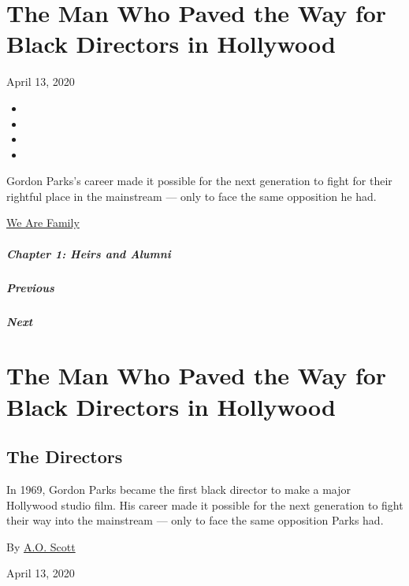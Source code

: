 \hypertarget{the-man-who-paved-the-way-for-black-directors-in-hollywood}{%
\section{The Man Who Paved the Way for Black Directors in
Hollywood}\label{the-man-who-paved-the-way-for-black-directors-in-hollywood}}

April 13, 2020

\begin{itemize}
\item
\item
\item
\item
\end{itemize}

Gordon Parks's career made it possible for the next generation to fight
for their rightful place in the mainstream --- only to face the same
opposition he had.

\href{https://www.nytimes.com/interactive/2020/04/13/t-magazine/culture-issue-2020.html}{We
Are Family}

\hypertarget{chapter-1-heirs-and-alumni}{%
\subparagraph{Chapter 1: Heirs and
Alumni}\label{chapter-1-heirs-and-alumni}}

\hypertarget{previous}{%
\subparagraph{Previous}\label{previous}}

\hypertarget{next}{%
\subparagraph{Next}\label{next}}

\hypertarget{the-man-who-paved-the-way-for-black-directors-in-hollywood-1}{%
\section{The Man Who Paved the Way for Black Directors in
Hollywood}\label{the-man-who-paved-the-way-for-black-directors-in-hollywood-1}}

\hypertarget{the-directors}{%
\subsection{The Directors}\label{the-directors}}

In 1969, Gordon Parks became the first black director to make a major
Hollywood studio film. His career made it possible for the next
generation to fight their way into the mainstream --- only to face the
same opposition Parks had.

By \href{https://www.nytimes.com/by/a-o--scott}{A.O. Scott}

April 13, 2020

